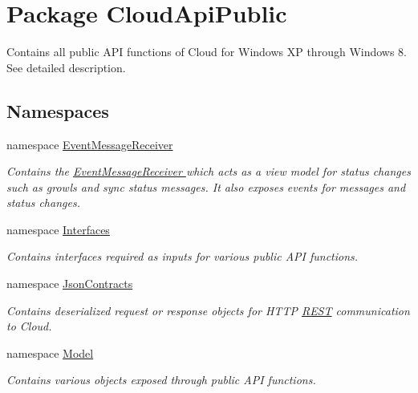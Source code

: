 \hypertarget{namespace_cloud_api_public}{\section{Package Cloud\-Api\-Public}
\label{namespace_cloud_api_public}
}


Contains all public A\-P\-I functions of Cloud for Windows X\-P through Windows 8. See detailed description.  


\subsection*{Namespaces}
\begin{DoxyCompactItemize}
\item 
namespace \hyperlink{namespace_cloud_api_public_1_1_event_message_receiver}{Event\-Message\-Receiver}
\begin{DoxyCompactList}\small\item\em Contains the \hyperlink{class_cloud_api_public_1_1_event_message_receiver_1_1_event_message_receiver}{Event\-Message\-Receiver } which acts as a view model for status changes such as growls and sync status messages. It also exposes events for messages and status changes. \end{DoxyCompactList}\item 
namespace \hyperlink{namespace_cloud_api_public_1_1_interfaces}{Interfaces}
\begin{DoxyCompactList}\small\item\em Contains interfaces required as inputs for various public A\-P\-I functions. \end{DoxyCompactList}\item 
namespace \hyperlink{namespace_cloud_api_public_1_1_json_contracts}{Json\-Contracts}
\begin{DoxyCompactList}\small\item\em Contains deserialized request or response objects for H\-T\-T\-P \hyperlink{namespace_cloud_api_public_1_1_r_e_s_t}{R\-E\-S\-T} communication to Cloud. \end{DoxyCompactList}\item 
namespace \hyperlink{namespace_cloud_api_public_1_1_model}{Model}
\begin{DoxyCompactList}\small\item\em Contains various objects exposed through public A\-P\-I functions. \end{DoxyCompactList}\item 

\end{DoxyCompactItemize}
